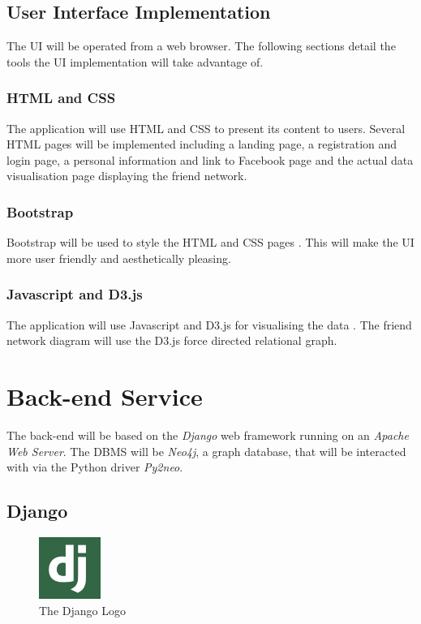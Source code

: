 \documentclass[10pt,onecolumn]{article}
\begin{document}
\subsection{User Interface Implementation}
The UI will be operated from a web browser. The following sections detail the tools the UI implementation will take advantage of.

\subsubsection{HTML and CSS}
The application will use HTML and CSS to present its content to users. Several HTML pages will be implemented including a landing page, a registration and login page, a personal information and link to Facebook page and the actual data visualisation page displaying the friend network.

\subsubsection{Bootstrap}
Bootstrap will be used to style the HTML and CSS pages \cite{Bootstrap}. This will make the UI more user friendly and aesthetically pleasing.

\subsubsection{Javascript and D3.js}
The application will use Javascript and D3.js for visualising the data \cite{D3}. The friend network diagram will use the D3.js force directed relational graph.

\section{Back-end Service}

The back-end will be based on the \emph{Django} web framework running on an \emph{Apache Web Server}. The DBMS will be \emph{Neo4j}, a graph database, that will be interacted with via the Python driver \emph{Py2neo}. 
\subsection{Django}
\begin{figure}
  \begin{center}
    \includegraphics[width=0.18\textwidth]{django}
  \end{center}
  \caption{The Django Logo}
\end{figure}
\end{document}
